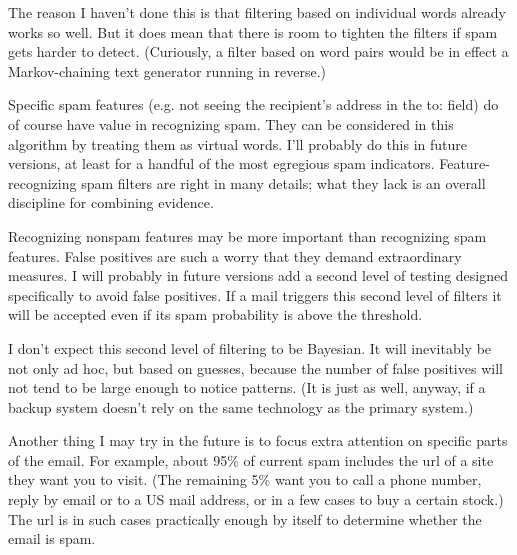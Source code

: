 The reason I
                    haven't done this is that filtering based on individual
                    words already works so well. But it does mean that there is
                    room to tighten the filters if spam gets harder to detect.
                    (Curiously, a filter based on word pairs would be in effect
                    a Markov-chaining text generator running in reverse.)

Specific
                    spam features (e.g. not seeing the recipient's address in
                    the to: field) do of course have value in recognizing spam.
                    They can be considered in this algorithm by treating them as
                    virtual words. I'll probably do this in future versions, at
                    least for a handful of the most egregious spam indicators.
                    Feature-recognizing spam filters are right in many details;
                    what they lack is an overall discipline for combining
                    evidence.

Recognizing nonspam features may be
                    more important than recognizing spam features. False
                    positives are such a worry that they demand extraordinary
                    measures. I will probably in future versions add a second
                    level of testing designed specifically to avoid false
                    positives. If a mail triggers this second level of filters
                    it will be accepted even if its spam probability is above
                    the threshold.

I don't expect this second level
                    of filtering to be Bayesian. It will inevitably be not only
                    ad hoc, but based on guesses, because the number of false
                    positives will not tend to be large enough to notice
                    patterns. (It is just as well, anyway, if a backup system
                    doesn't rely on the same technology as the primary
                    system.)

Another thing I may try in the future is
                    to focus extra attention on specific parts of the email. For
                    example, about 95\% of current spam includes the url of a
                    site they want you to visit. (The remaining 5\% want you to
                    call a phone number, reply by email or to a US mail address,
                    or in a few cases to buy a certain stock.) The url is in
                    such cases practically enough by itself to determine whether
                    the email is spam.

